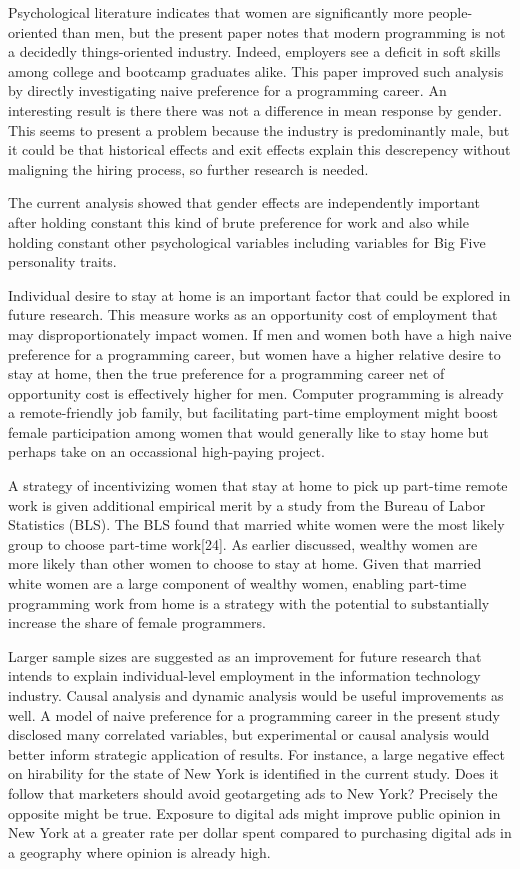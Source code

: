 \documentclass[review]{elsarticle}
\begin{document}
Psychological literature indicates that women are significantly more people-oriented than men,
but the present paper notes that modern programming is not a decidedly things-oriented industry.
Indeed, employers see a deficit in soft skills among college and bootcamp graduates alike.
This paper improved such analysis by directly investigating naive preference for a programming career.
An interesting result is there there was not a difference in mean response by gender.
This seems to present a problem because the industry is predominantly male,
but it could be that historical effects and exit effects explain this descrepency without maligning the hiring process,
so further research is needed.

The current analysis showed that gender effects are independently important
after holding constant this kind of brute preference for work
and also while holding constant other psychological variables including variables for Big Five personality traits.

Individual desire to stay at home is an important factor that could be explored in future research.
This measure works as an opportunity cost of employment that may disproportionately impact women.
If men and women both have a high naive preference for a programming career,
but women have a higher relative desire to stay at home,
then the true preference for a programming career net of opportunity cost is effectively higher for men.
Computer programming is already a remote-friendly job family,
but facilitating part-time employment might boost female participation among women that would generally like to stay home
but perhaps take on an occassional high-paying project.

A strategy of incentivizing women that stay at home to pick up part-time remote work
is given additional empirical merit by a study from the Bureau of Labor Statistics (BLS).
The BLS found that married white women were the most likely group to choose part-time work[24].
As earlier discussed, wealthy women are more likely than other women to choose to stay at home.
Given that married white women are a large component of wealthy women,
enabling part-time programming work from home
is a strategy with the potential to substantially increase the share of female programmers.

Larger sample sizes are suggested as an improvement for future research that intends to explain individual-level employment in the information technology industry.
Causal analysis and dynamic analysis would be useful improvements as well.
A model of naive preference for a programming career in the present study disclosed many correlated variables,
but experimental or causal analysis would better inform strategic application of results.
For instance, a large negative effect on hirability for the state of New York is identified in the current study.
Does it follow that marketers should avoid geotargeting ads to New York?
Precisely the opposite might be true.
Exposure to digital ads might improve public opinion in New York at a greater rate per dollar spent
compared to purchasing digital ads in a geography where opinion is already high.
\end{document}
